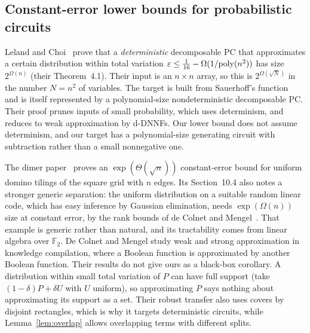 \subsection{Constant-error lower bounds for probabilistic circuits}

Leland and Choi~\cite{LelandChoi25} prove that a \emph{deterministic} decomposable PC that approximates a certain distribution within total variation $\varepsilon\le\frac1{16}-\Omega(1/\mathrm{poly}(n^2))$ has size $2^{\Omega(n)}$ (their Theorem~4.1). Their input is an $n\times n$ array, so this is $2^{\Omega(\sqrt N)}$ in the number $N=n^2$ of variables. The target is built from Sauerhoff's function~\cite{Sauerhoff03} and is itself represented by a polynomial-size nondeterministic decomposable PC. Their proof prunes inputs of small probability, which uses determinism, and reduces to weak approximation by d-DNNFs. Our lower bound does not assume determinism, and our target has a polynomial-size generating circuit with subtraction rather than a small nonnegative one.

The dimer paper~\cite{Blaschke26Dimers} proves an $\exp(\Theta(\sqrt n))$ constant-error bound for uniform domino tilings of the square grid with $n$ edges. Its Section~10.4 also notes a stronger generic separation: the uniform distribution on a suitable random linear code, which has easy inference by Gaussian elimination, needs $\exp(\Omega(n))$ size at constant error, by the rank bounds of de Colnet and Mengel~\cite{DeColnetMengel20}. That example is generic rather than natural, and its tractability comes from linear algebra over $\mathbb F_2$. De Colnet and Mengel study weak and strong approximation in knowledge compilation, where a Boolean function is approximated by another Boolean function. Their results do not give ours as a black-box corollary. A distribution within small total variation of $P$ can have full support (take $(1-\delta)P+\delta U$ with $U$ uniform), so approximating $P$ says nothing about approximating its support as a set. Their robust transfer also uses covers by disjoint rectangles, which is why it targets deterministic circuits, while Lemma~\ref{lem:overlap} allows overlapping terms with different splits.

